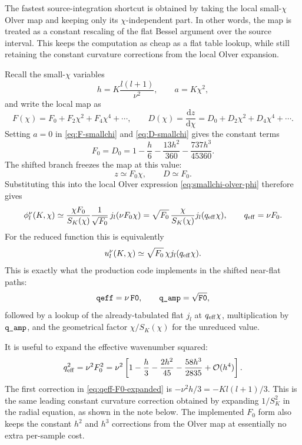 \documentclass[11pt,a4paper]{article}
\newcommand{\dd}{\mathrm{d}}
\newcommand{\code}[1]{\texttt{\detokenize{#1}}}
\newcommand{\SK}{S_K}
\newcommand{\order}{\mathcal{O}}
\begin{document}
The fastest source-integration shortcut is obtained by taking the local
small-\(\chi\) Olver map and keeping only its \(\chi\)-independent part.  In
other words, the map is treated as a constant rescaling of the flat Bessel
argument over the source interval.  This keeps the computation as cheap as a
flat table lookup, while still retaining the constant curvature corrections
from the local Olver expansion.

Recall the small-\(\chi\) variables
\begin{equation}
  h=K\frac{l(l+1)}{\nu^2},\qquad a=K\chi^2,
\end{equation}
and write the local map as
\begin{equation}
  F(\chi)=F_0+F_2\chi^2+F_4\chi^4+\cdots,\qquad
  D(\chi)=\frac{\dd z}{\dd\chi}=D_0+D_2\chi^2+D_4\chi^4+\cdots.
\end{equation}
Setting \(a=0\) in \eqref{eq:F-smallchi} and \eqref{eq:D-smallchi} gives the
constant terms
\begin{equation}
  F_0=D_0
  =1-\frac{h}{6}-\frac{13h^2}{360}-\frac{737h^3}{45360}.
  \label{eq:F0-shift}
\end{equation}
The shifted branch freezes the map at this value:
\begin{equation}
  z\simeq F_0\chi,\qquad D\simeq F_0.
\end{equation}
Substituting this into the local Olver expression \eqref{eq:smallchi-olver-phi}
therefore gives
\begin{equation}
  \phi_l^\nu(K,\chi)\simeq
  \frac{\chi F_0}{\SK(\chi)}\frac{1}{\sqrt{F_0}}\,
  j_l(\nu F_0\chi)
  =
  \sqrt{F_0}\,\frac{\chi}{\SK(\chi)}j_l(q_{\rm eff}\chi),
  \qquad q_{\rm eff}=\nu F_0.
  \label{eq:shifted-q}
\end{equation}
For the reduced function this is equivalently
\begin{equation}
  u_l^\nu(K,\chi)\simeq \sqrt{F_0}\,\chi j_l(q_{\rm eff}\chi).
\end{equation}
This is exactly what the production code implements in the shifted near-flat
paths:
\begin{equation}
  \code{qeff}=\nu\,\code{F0},\qquad
  \code{q_amp}=\sqrt{\code{F0}},
\end{equation}
followed by a lookup of the already-tabulated flat \(j_l\) at
\(q_{\rm eff}\chi\), multiplication by \(\code{q_amp}\), and the geometrical
factor \(\chi/\SK(\chi)\) for the unreduced value.

It is useful to expand the effective wavenumber squared:
\begin{equation}
  q_{\rm eff}^2
  =\nu^2F_0^2
  =\nu^2\left[
  1-\frac{h}{3}-\frac{2h^2}{45}-\frac{58h^3}{2835}
  +\order(h^4)\right].
  \label{eq:qeff-F0-expanded}
\end{equation}
The first correction in \eqref{eq:qeff-F0-expanded} is
\(-\nu^2 h/3=-K l(l+1)/3\).  This is the same leading constant curvature
correction obtained by expanding \(1/\SK^2\) in the radial equation, as shown in
the note below.  The implemented \(F_0\) form also keeps the constant \(h^2\)
and \(h^3\) corrections from the Olver map at essentially no extra per-sample
cost.
\end{document}
